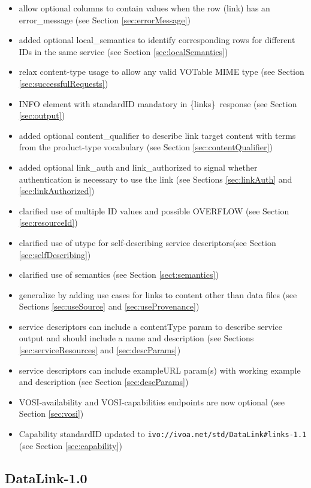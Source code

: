 \documentclass[11pt,a4paper]{ivoa}
\newcommand{\blinks}{\{links\}}
\begin{document}
\begin{itemize}
\item allow optional columns to contain values when the row (link) has an error\_message
(see Section \ref{sec:errorMessage})
\item added optional local\_semantics to identify corresponding rows
	for different IDs in the same service (see Section \ref{sec:localSemantics})
\item relax content-type usage to allow any valid VOTable MIME type (see Section
  \ref{sec:successfulRequests})
\item INFO element with standardID mandatory in \blinks\ response (see Section
  \ref{sec:output})
\item added optional content\_qualifier to describe link target content with terms from
the product-type vocabulary (see Section \ref{sec:contentQualifier})
\item added optional link\_auth and link\_authorized to signal whether authentication
is necessary to use the link (see Sections \ref{sec:linkAuth} and
\ref{sec:linkAuthorized})
\item clarified use of multiple ID values and possible OVERFLOW (see Section
  \ref{sec:resourceId})
\item clarified use of utype for self-describing service descriptors(see Section
  \ref{sec:selfDescribing})
\item clarified use of semantics (see Section \ref{sect:semantics})
\item generalize by adding use cases for links to content other than data files
  (see Sections \ref{sec:useSource} and \ref{sec:useProvenance})
\item service descriptors can include a contentType param to describe service
output and should include a name and description (see Sections \ref{sec:serviceResources}
and \ref{sec:descParams})
\item service descriptors can include exampleURL param(s) with working example
and description (see Section \ref{sec:descParams})
\item VOSI-availability and VOSI-capabilities endpoints are now optional (see
  Section \ref{sec:vosi})
\item Capability standardID updated to
  \verb|ivo://ivoa.net/std/DataLink#links-1.1|
  (see Section \ref{sec:capability})
\end{itemize}

\subsection{DataLink-1.0}
\end{document}
